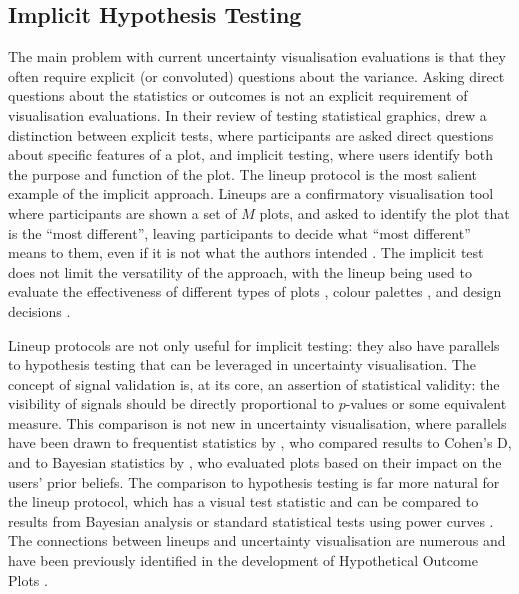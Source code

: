 \documentclass[]{ar-1col-S2O}
\begin{document}
\subsection{Implicit Hypothesis
Testing}\label{implicit-hypothesis-testing}

The main problem with current uncertainty visualisation evaluations is
that they often require explicit (or convoluted) questions about the
variance. Asking direct questions about the statistics or outcomes is
not an explicit requirement of visualisation evaluations. In their
review of testing statistical graphics, \citet{Vanderplas2020} drew a
distinction between explicit tests, where participants are asked direct
questions about specific features of a plot, and implicit testing, where
users identify both the purpose and function of the plot. The lineup
protocol is the most salient example of the implicit approach. Lineups
are a confirmatory visualisation tool where participants are shown a set
of \(M\) plots, and asked to identify the plot that is the ``most
different'', leaving participants to decide what ``most different''
means to them, even if it is not what the authors intended
\citep{vanderplas2017}. The implicit test does not limit the versatility
of the approach, with the lineup being used to evaluate the
effectiveness of different types of plots \citep{Hofmann2012}, colour
palettes \citep{Reda2021}, and design decisions \citep{vanderplas2017}.

Lineup protocols are not only useful for implicit testing: they also
have parallels to hypothesis testing that can be leveraged in
uncertainty visualisation. The concept of signal validation is, at its
core, an assertion of statistical validity: the visibility of signals
should be directly proportional to \(p\)-values or some equivalent
measure. This comparison is not new in uncertainty visualisation, where
parallels have been drawn to frequentist statistics by
\citet{Correll2014}, who compared results to Cohen's D, and to Bayesian
statistics by \citet{Kim2019}, who evaluated plots based on their impact
on the users' prior beliefs. The comparison to hypothesis testing is far
more natural for the lineup protocol, which has a visual test statistic
and can be compared to results from Bayesian analysis
\citep{vanderplas2017} or standard statistical tests using power curves
\citep{Majumder2013, Patrick2023}. The connections between lineups and
uncertainty visualisation are numerous and have been previously
identified in the development of Hypothetical Outcome Plots
\citep{Hullman2015}.
\end{document}
